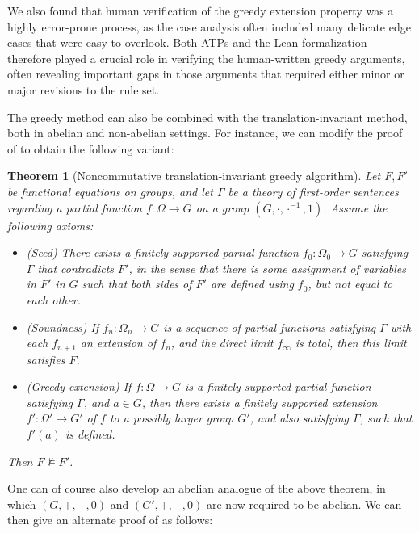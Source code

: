 \documentclass[12pt]{amsart}
\newtheorem{theorem}{Theorem}[section]
\theoremstyle{definition}
\newcommand{\nmodels}{\not\models}
\begin{document}
We also found that human verification of the greedy extension property was a highly error-prone process, as the case analysis often included many delicate edge cases that were easy to overlook.  Both ATPs and the Lean formalization therefore played a crucial role in verifying the human-written greedy arguments, often revealing important gaps in those arguments that required either minor or major revisions to the rule set.

The greedy method can also be combined with the translation-invariant method, both in abelian and non-abelian settings. For instance, we can modify the proof of  to obtain the following variant:

\begin{theorem}[Noncommutative translation-invariant greedy algorithm]\label{nc-greedy-abstract} Let $F,F'$ be functional equations on groups, and let $\Gamma$ be a theory of first-order sentences regarding a partial function $f \colon \Omega \to G$ on a group $(G,\cdot, \cdot^{-1},1)$.  Assume the following axioms:
  \setlength{\parskip}{0pt}
  \begin{itemize}
    \item[(i)] (Seed) There exists a finitely supported partial function $f_0 \colon \Omega_0 \to G$ satisfying $\Gamma$ that contradicts $F'$, in the sense that there is some assignment of variables in $F'$ in $G$ such that both sides of $F'$ are defined using $f_0$, but not equal to each other.
    \item[(ii)]  (Soundness)  If $f_n \colon \Omega_n \to G$ is a sequence of partial functions satisfying $\Gamma$ with each $f_{n+1}$ an extension of $f_n$, and the direct limit $f_\infty$ is total, then this limit satisfies $F$.
    \item[(iii)] (Greedy extension)  If $f \colon \Omega \to G$ is a finitely supported partial function satisfying $\Gamma$, and $a \in G$, then there exists a finitely supported extension $f' \colon \Omega' \to G'$ of $f$ to a possibly larger group $G'$, and also satisfying $\Gamma$, such that $f'(a)$ is defined.
  \end{itemize}
  Then $F \nmodels F'$.
\end{theorem}

One can of course also develop an abelian analogue of the above theorem, in which $(G,+,-,0)$ and $(G',+,-,0)$ are now required to be abelian.  We can then give an alternate proof of  as follows:
\end{document}
